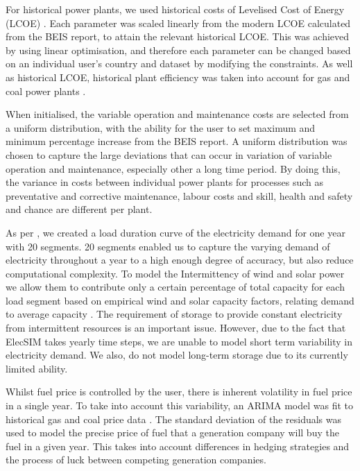 For historical power plants, we used historical costs of Levelised Cost of Energy (LCOE) \cite{Dale2013}. Each parameter was scaled linearly from the modern LCOE calculated from the BEIS report, to attain the relevant historical LCOE. This was achieved by using linear optimisation, and therefore each parameter can be changed based on an individual user's country and dataset by modifying the constraints. As well as historical LCOE, historical plant efficiency was taken into account for gas and coal power plants \cite{EIA2013}.

When initialised, the variable operation and maintenance costs are selected from a uniform distribution, with the ability for the user to set maximum and minimum percentage increase from the BEIS report. A uniform distribution was chosen to capture the large deviations that can occur in variation of variable operation and maintenance, especially other a long time period. By doing this, the variance in costs between individual power plants for processes such as preventative and corrective maintenance, labour costs and skill, health and safety and chance are different per plant.  

As per \cite{Chappin2017}, we created a load duration curve of the electricity demand for one year with 20 segments. 20 segments enabled us to capture the varying demand of electricity throughout a year to a high enough degree of accuracy, but also reduce computational complexity. To model the Intermittency of wind and solar power we allow them to contribute only a certain percentage of total capacity for each load segment based on empirical wind and solar capacity factors, relating demand to average capacity \cite{Pfenninger2016, Staffell2016, Chappin2017}. The requirement of storage to provide constant electricity from intermittent resources is an important issue. However, due to the fact that ElecSIM takes yearly time steps, we are unable to model short term variability in electricity demand. We also, do not model long-term storage due to its currently limited ability. 

Whilst fuel price is controlled by the user, there is inherent volatility in fuel price in a single year. To take into account this variability, an ARIMA model was fit to historical gas and coal price data \cite{coalprices,gasprices}. The standard deviation of the residuals was used to model the precise price of fuel that a generation company will buy the fuel in a given year. This takes into account differences in hedging strategies and the process of luck between competing generation companies.

